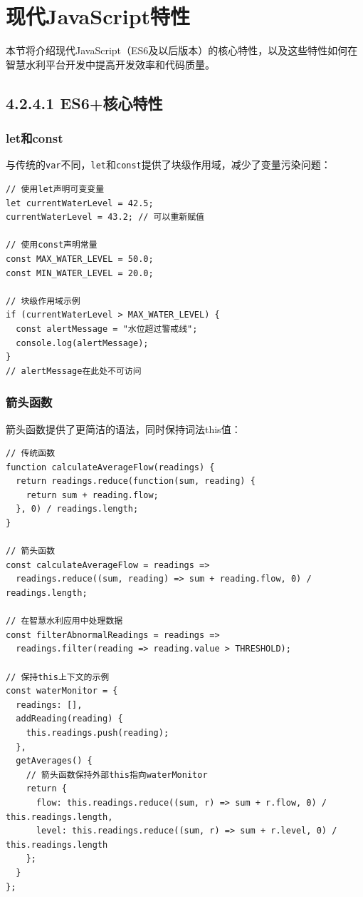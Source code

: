 \section{现代JavaScript特性}\label{ux73b0ux4ee3javascriptux7279ux6027}

本节将介绍现代JavaScript（ES6及以后版本）的核心特性，以及这些特性如何在智慧水利平台开发中提高开发效率和代码质量。

\subsection{4.2.4.1 ES6+核心特性}\label{es6ux6838ux5fc3ux7279ux6027}

\subsubsection{let和const}\label{letux548cconst}

与传统的\passthrough{\lstinline!var!}不同，\passthrough{\lstinline!let!}和\passthrough{\lstinline!const!}提供了块级作用域，减少了变量污染问题：

\begin{lstlisting}
// 使用let声明可变变量
let currentWaterLevel = 42.5;
currentWaterLevel = 43.2; // 可以重新赋值

// 使用const声明常量
const MAX_WATER_LEVEL = 50.0;
const MIN_WATER_LEVEL = 20.0;

// 块级作用域示例
if (currentWaterLevel > MAX_WATER_LEVEL) {
  const alertMessage = "水位超过警戒线";
  console.log(alertMessage);
}
// alertMessage在此处不可访问
\end{lstlisting}

\subsubsection{箭头函数}\label{ux7badux5934ux51fdux6570}

箭头函数提供了更简洁的语法，同时保持词法this值：

\begin{lstlisting}
// 传统函数
function calculateAverageFlow(readings) {
  return readings.reduce(function(sum, reading) {
    return sum + reading.flow;
  }, 0) / readings.length;
}

// 箭头函数
const calculateAverageFlow = readings => 
  readings.reduce((sum, reading) => sum + reading.flow, 0) / readings.length;

// 在智慧水利应用中处理数据
const filterAbnormalReadings = readings => 
  readings.filter(reading => reading.value > THRESHOLD);

// 保持this上下文的示例
const waterMonitor = {
  readings: [],
  addReading(reading) {
    this.readings.push(reading);
  },
  getAverages() {
    // 箭头函数保持外部this指向waterMonitor
    return {
      flow: this.readings.reduce((sum, r) => sum + r.flow, 0) / this.readings.length,
      level: this.readings.reduce((sum, r) => sum + r.level, 0) / this.readings.length
    };
  }
};
\end{lstlisting}

